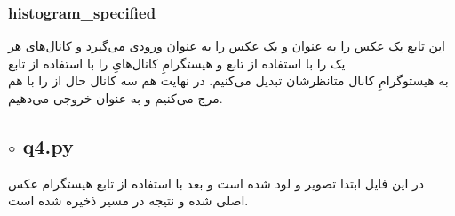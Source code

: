 \documentclass[a4paper,12pt]{article}
\begin{document}
  \subsubsection*{histogram\_specified}
  این تابع یک عکس را به عنوان 
  و یک عکس را به عنوان
  ورودی می‌گیرد و کانال‌های هر یک را با استفاده از تابع
  و هیستگرامِ کانال‌هایِ 
  را با استفاده از تابع \\
  به هیستوگرامِ کانال متانظرشان تبدیل می‌کنیم. در نهایت هم سه کانال حال از
  را با هم مرج می‌کنیم و به عنوان خروجی می‌دهیم.
\subsection*{$\circ$ q4.py}
در این فایل ابتدا تصویر 
و 
لود شده است و بعد با استفاده از تابع 
هیستگرام عکس اصلی 
شده و نتیجه در مسیر
  ذخیره شده است.
\end{document}
